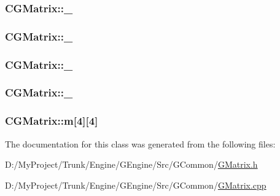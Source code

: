 \subsubsection[{\+\_\+41}]{ C\+G\+Matrix\+::\+\_}\label{class_c_g_matrix_ab1b3ab68107e465aa14c09bbba8ea410}
\hypertarget{class_c_g_matrix_a7f22242f1d45215507afeb12a8ec29e9}{}
\subsubsection[{\+\_\+42}]{ C\+G\+Matrix\+::\+\_}\label{class_c_g_matrix_a7f22242f1d45215507afeb12a8ec29e9}
\hypertarget{class_c_g_matrix_a8eafb9e15b09f71966ceb9f7e7afff19}{}
\subsubsection[{\+\_\+43}]{ C\+G\+Matrix\+::\+\_}\label{class_c_g_matrix_a8eafb9e15b09f71966ceb9f7e7afff19}
\hypertarget{class_c_g_matrix_aaa8b7900e9be1da49e52d815f6ea2843}{}
\subsubsection[{\+\_\+44}]{ C\+G\+Matrix\+::\+\_}\label{class_c_g_matrix_aaa8b7900e9be1da49e52d815f6ea2843}
\hypertarget{class_c_g_matrix_a4e8b3bcd13b99f8faccc85af54a4b3b2}{}
\subsubsection[{m}]{ C\+G\+Matrix\+::m\mbox{[}4\mbox{]}\mbox{[}4\mbox{]}}\label{class_c_g_matrix_a4e8b3bcd13b99f8faccc85af54a4b3b2}


The documentation for this class was generated from the following files\+:\begin{DoxyCompactItemize}
\item 
D\+:/\+My\+Project/\+Trunk/\+Engine/\+G\+Engine/\+Src/\+G\+Common/\hyperlink{_g_matrix_8h}{G\+Matrix.\+h}\item 
D\+:/\+My\+Project/\+Trunk/\+Engine/\+G\+Engine/\+Src/\+G\+Common/\hyperlink{_g_matrix_8cpp}{G\+Matrix.\+cpp}\end{DoxyCompactItemize}
